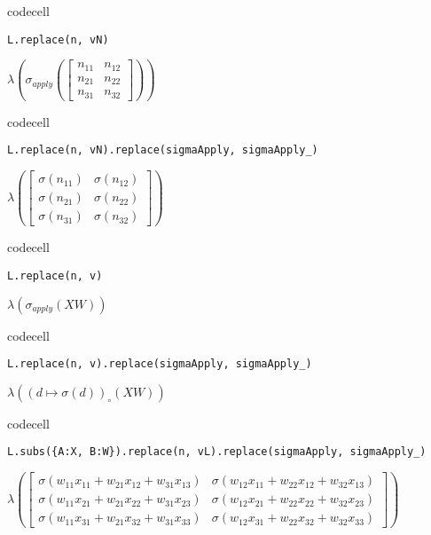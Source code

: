 codecell

\begin{verbatim}
L.replace(n, vN)
\end{verbatim}

$\displaystyle \lambda{\left(\sigma_{apply}{\left(\left[\begin{matrix}n_{11} & n_{12}\\n_{21} & n_{22}\\n_{31} & n_{32}\end{matrix}\right] \right)} \right)}$

codecell

\begin{verbatim}
L.replace(n, vN).replace(sigmaApply, sigmaApply_)
\end{verbatim}

$\displaystyle \lambda{\left(\left[\begin{matrix}\sigma{\left(n_{11} \right)} & \sigma{\left(n_{12} \right)}\\\sigma{\left(n_{21} \right)} & \sigma{\left(n_{22} \right)}\\\sigma{\left(n_{31} \right)} & \sigma{\left(n_{32} \right)}\end{matrix}\right] \right)}$

codecell

\begin{verbatim}
L.replace(n, v)
\end{verbatim}

$\displaystyle \lambda{\left(\sigma_{apply}{\left(X W \right)} \right)}$

codecell


\begin{verbatim}
L.replace(n, v).replace(sigmaApply, sigmaApply_)
\end{verbatim}

$\displaystyle \lambda{\left({\left( d \mapsto \sigma{\left(d \right)} \right)}_{\circ}\left({X W}\right) \right)}$

codecell

\begin{verbatim}
L.subs({A:X, B:W}).replace(n, vL).replace(sigmaApply, sigmaApply_)
\end{verbatim}

$\displaystyle \lambda{\left(\left[\begin{matrix}\sigma{\left(w_{11} x_{11} + w_{21} x_{12} + w_{31} x_{13} \right)} & \sigma{\left(w_{12} x_{11} + w_{22} x_{12} + w_{32} x_{13} \right)}\\\sigma{\left(w_{11} x_{21} + w_{21} x_{22} + w_{31} x_{23} \right)} & \sigma{\left(w_{12} x_{21} + w_{22} x_{22} + w_{32} x_{23} \right)}\\\sigma{\left(w_{11} x_{31} + w_{21} x_{32} + w_{31} x_{33} \right)} & \sigma{\left(w_{12} x_{31} + w_{22} x_{32} + w_{32} x_{33} \right)}\end{matrix}\right] \right)}$

